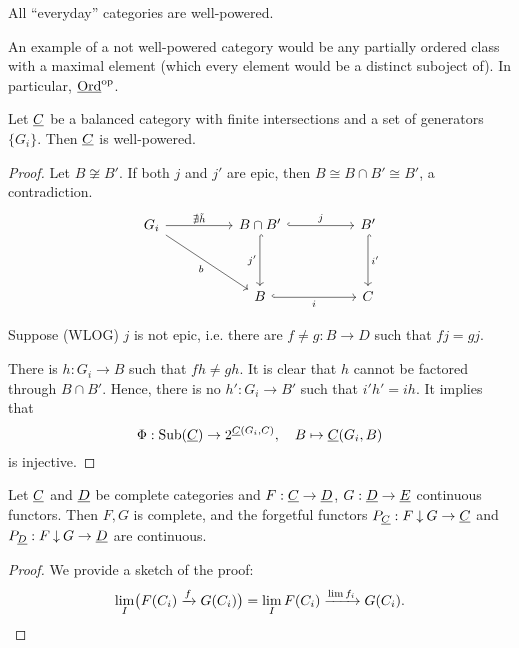 \begin{examples*}
	\item All \enquote{everyday} categories are well-powered.
	\item An example of a not well-powered category would be any partially ordered class with a maximal element (which every element would be a distinct suboject of). In particular, \( \underline{\mathrm{Ord}}^\mathrm{op} \).
\end{examples*}

\begin{theorem*}[Electrification]
	Let \( \underline{C} \) be a balanced category with finite intersections and a set of generators \( \{G_i\} \). Then \( \underline{C} \) is well-powered.
\end{theorem*}
\begin{proof}
	Let \( B \not\cong B' \). If both \( j \) and \( j' \) are epic, then \( B \cong B \cap B' \cong B' \), a contradiction.
	\[
		\begin{tikzcd}{G_i} && {B \cap B'} && {B'} \\
			\\
			&& B && C
			\arrow["{\nexists \tilde{h}}", from=1-1, to=1-3]
			\arrow["b"', from=1-1, to=3-3]
			\arrow["j", hook, from=1-3, to=1-5]
			\arrow["{j'}"', hook, from=1-3, to=3-3]
			\arrow["{i'}", hook, from=1-5, to=3-5]
			\arrow["i"', hook, from=3-3, to=3-5]
		\end{tikzcd}
	\]

	Suppose (WLOG) \( j \) is not epic, i.e. there are \( f \neq g: B \to D \) such that \( fj = gj \).

	\vspace*{2mm}

	There is \( h: G_i \to B \) such that \( fh \neq gh \). It is clear that \( h \) cannot be factored through \( B \cap B' \). Hence, there is no \( h': G_i \to B' \) such that \( i' h' = ih \). It implies that
	\[
		\Phi: \operatorname{Sub}(\underline{C}) \to 2^{\underline{C}(G_i, C)}, \quad B \mapsto \underline{C}(G_i, B)
	\]
	is injective.
\end{proof}

\begin{lemma*}
	Let \( \underline{C} \) and \( \underline{D} \) be complete categories and \( F: \underline{C} \to \underline{D} \), \( G: \underline{D} \to \underline{E} \) continuous functors. Then \( F \comma G \) is complete, and the forgetful functors \( P_{\underline{C}}: F \mathbin{\downarrow} G \to \underline{C} \) and \( P_{\underline{D}}: F \mathbin{\downarrow} G \to \underline{D} \) are continuous.
\end{lemma*}
\begin{proof}
	We provide a sketch of the proof:
	\[
		\lim_I\bigl(F(C_i) \xrightarrow{f} G(C_i)\bigr) = \lim_I F(C_i) \xrightarrow{\lim f_i} G(C_i).
	\]
\end{proof}

